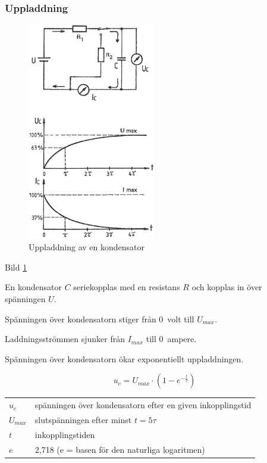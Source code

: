 \subsubsection{Uppladdning}

\begin{figure}
\includegraphics[width=0.5\textwidth]{images/cropped_pdfs/bild_2_3-08.pdf}
\caption{Uppladdning av en kondensator}
\label{fig:BildII3-08}
\end{figure}


Bild \ref{fig:BildII3-08}

En kondensator \(C\) seriekopplas med en resistans \(R\)
och kopplas in över spänningen \(U\).

Spänningen över kondensatorn stiger från 0~volt till \(U_{max}\).

Laddningsströmmen sjunker från \(I_{max}\) till 0~ampere.

Spänningen över kondensatorn ökar exponentiellt uppladdningen.

\[u_c = U_{max} \cdot ( 1 - e^{-\frac{t}{\tau}} )\]

\begin{tabular}{lp{}}
  \(u_c\)     & spänningen över kondensatorn efter en given inkopplingstid \\
  \(U_{max}\) & slutspänningen efter minst \(t = 5\tau\) \\
  \(t\)       & inkopplingstiden \\
  \(e\)       & 2,718 (e = basen för den naturliga logaritmen) \\
\end{tabular}

